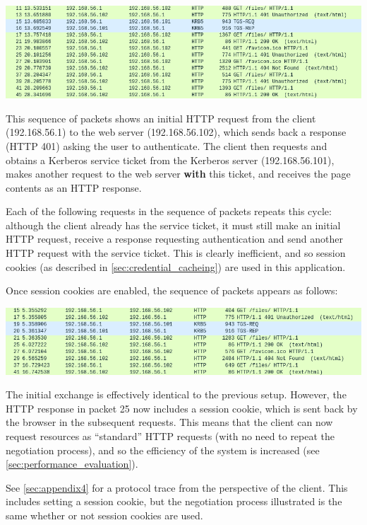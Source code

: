 \documentclass[12pt]{report}
\begin{document}
\begin{center}
  \includegraphics[width=\textwidth]{09-connect-no-cookie.png}
\end{center}

This sequence of packets shows an initial HTTP request from the client (192.168.56.1) to the web server (192.168.56.102), which sends back a response (HTTP 401) asking the user to authenticate. The client then requests and obtains a Kerberos service ticket from the Kerberos server (192.168.56.101), makes another request to the web server \textbf{with} this ticket, and receives the page contents as an HTTP response.

Each of the following requests in the sequence of packets repeats this cycle: although the client already has the service ticket, it must still make an initial HTTP request, receive a response requesting authentication and send another HTTP request with the service ticket. This is clearly inefficient, and so session cookies (as described in \autoref{sec:credential_cacheing}) are used in this application.

Once session cookies are enabled, the sequence of packets appears as follows:

\begin{center}
  \includegraphics[width=\textwidth]{10-connect-cookie.png}
\end{center}

The initial exchange is effectively identical to the previous setup. However, the HTTP response in packet 25 now includes a session cookie, which is sent back by the browser in the subsequent requests. This means that the client can now request resources as ``standard'' HTTP requests (with no need to repeat the negotiation process), and so the efficiency of the system is increased (see \autoref{sec:performance_evaluation}).

See \autoref{sec:appendix4} for a protocol trace from the perspective of the client. This includes setting a session cookie, but the negotiation process illustrated is the same whether or not session cookies are used.
\end{document}
